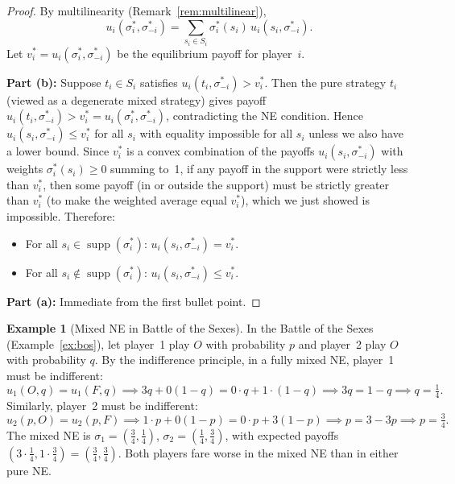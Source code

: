 \documentclass[11pt,a4paper]{article}
\theoremstyle{definition}
\newtheorem{example}{Example}[section]
\theoremstyle{plain}
\theoremstyle{remark}
\DeclareMathOperator{\supp}{supp}
\begin{document}
\begin{proof}
By multilinearity (Remark~\ref{rem:multilinear}),
\[
    u_i(\sigma_i^*, \sigma_{-i}^*) = \sum_{s_i \in S_i} \sigma_i^*(s_i)\, u_i(s_i, \sigma_{-i}^*).
\]
Let $v_i^* = u_i(\sigma_i^*, \sigma_{-i}^*)$ be the equilibrium payoff for player~$i$.

\textbf{Part (b):} Suppose $t_i \in S_i$ satisfies $u_i(t_i, \sigma_{-i}^*) > v_i^*$.
Then the pure strategy $t_i$ (viewed as a degenerate mixed strategy) gives payoff
$u_i(t_i, \sigma_{-i}^*) > v_i^* = u_i(\sigma_i^*, \sigma_{-i}^*)$, contradicting the
NE condition. Hence $u_i(s_i, \sigma_{-i}^*) \leq v_i^*$ for all $s_i$ with equality
impossible for all $s_i$ unless we also have a lower bound. Since
$v_i^*$ is a convex combination of the payoffs $u_i(s_i, \sigma_{-i}^*)$ with
weights $\sigma_i^*(s_i) \geq 0$ summing to~1, if any payoff in the support were
strictly less than $v_i^*$, then some payoff (in or outside the support) must be
strictly greater than $v_i^*$ (to make the weighted average equal $v_i^*$), which
we just showed is impossible. Therefore:
\begin{itemize}[nosep]
    \item For all $s_i \in \supp(\sigma_i^*)$: $u_i(s_i, \sigma_{-i}^*) = v_i^*$.
    \item For all $s_i \notin \supp(\sigma_i^*)$: $u_i(s_i, \sigma_{-i}^*) \leq v_i^*$.
\end{itemize}

\textbf{Part (a):} Immediate from the first bullet point.
\end{proof}

\begin{example}[Mixed NE in Battle of the Sexes]
\label{ex:mixed_bos}
In the Battle of the Sexes (Example~\ref{ex:bos}), let player~1 play $O$ with
probability $p$ and player~2 play $O$ with probability $q$. By the indifference
principle, in a fully mixed NE, player~1 must be indifferent:
\[
    u_1(O, q) = u_1(F, q) \implies 3q + 0(1-q) = 0 \cdot q + 1 \cdot (1-q)
    \implies 3q = 1 - q \implies q = \tfrac{1}{4}.
\]
Similarly, player~2 must be indifferent:
\[
    u_2(p, O) = u_2(p, F) \implies 1 \cdot p + 0(1-p) = 0 \cdot p + 3(1-p)
    \implies p = 3 - 3p \implies p = \tfrac{3}{4}.
\]
The mixed NE is $\sigma_1 = (\tfrac{3}{4}, \tfrac{1}{4})$,
$\sigma_2 = (\tfrac{1}{4}, \tfrac{3}{4})$, with expected payoffs
$(3 \cdot \tfrac{1}{4}, 1 \cdot \tfrac{3}{4}) = (\tfrac{3}{4}, \tfrac{3}{4})$.
Both players fare worse in the mixed NE than in either pure NE.
\end{example}
\end{document}
